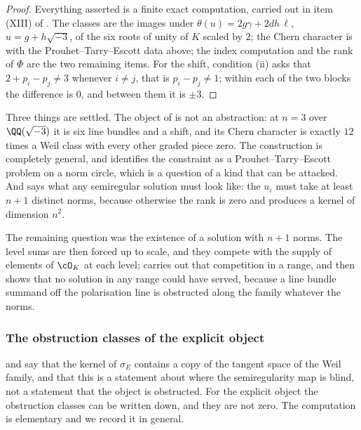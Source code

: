 \begin{proof}
Everything asserted is a finite exact computation, carried out in item (XIII)
of . The classes are the images under
$\theta(u)=2g\gamma+2dh\,\ell$, $u=g+h\sqrt{-3}$, of the six roots of unity
of $K$ scaled by $2$; the Chern character is  with the
Prouhet--Tarry--Escott data above; the index computation and the rank of
$\Phi$ are the two remaining items. For the shift, condition (ii) asks that
$2+p_{i}-p_{j}\ne3$ whenever $i\ne j$, that is $p_{i}-p_{j}\ne1$; within each
of the two blocks the difference is $0$, and between them it is $\pm3$.
\end{proof}

\begin{remark}\label{rem:pteoutcome}
Three things are settled. The object of  is not an
abstraction: at $n=3$ over $\QQ(\sqrt{-3})$ it is six line bundles and a
shift, and its Chern character is exactly $12$ times a Weil class with every
other graded piece zero. The construction is completely general, and
 identifies the constraint as a Prouhet--Tarry--Escott problem
on a norm circle, which is a question of a kind that can be attacked. And
 says what any semiregular solution must look like: the
$u_{i}$ must take at least $n+1$ distinct norms, because otherwise the rank is
zero and  produces a kernel of dimension $n^{2}$.

The remaining question was the existence of a solution with $n+1$ norms. The
level sums are then forced up to scale, and they compete with the supply of
elements of $\cO_{K}$ at each level;  carries out that
competition in a range, and  then shows that no solution in
any range could have served, because a line bundle summand off the
polarisation line is obstructed along the family whatever the norms.
\end{remark}

\subsubsection*{The obstruction classes of the explicit object}

 and  say that the kernel of
$\sigma_{E}$ contains a copy of the tangent space of the Weil family, and
that this is a statement about where the semiregularity map is blind, not a
statement that the object is obstructed. For the explicit object the
obstruction classes can be written down, and they are not zero. The
computation is elementary and we record it in general.

